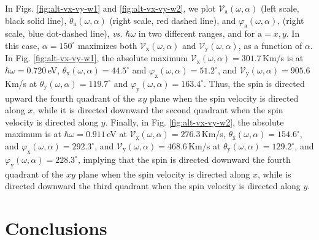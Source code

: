\documentclass[floatfix,prb,aps,superscriptaddress,showpacs,11pt,preprint,letterpaper]{revtex4}
\begin{document}
In Figs. \ref{fig:alt-vx-vy-w1} and \ref{fig:alt-vx-vy-w2}, we plot
$\mathcal{V}_{\mathrm{a}} (\omega,\alpha)$ (left scale, black solid line),
$\theta_{\mathrm{a}} (\omega,\alpha)$ (right scale, red dashed line), and
$\varphi_{\mathrm{a}} (\omega,\alpha)$, (right scale, blue dot-dashed  line), {\it vs.}
$\hbar\omega$ in two different ranges, and  for $\mathrm{a}=x,y$. In this case,
$\alpha=150^\circ$  maximizes both $\mathcal{V}_{\mathrm{x}} (\omega,\alpha)$
and $\mathcal{V}_{\mathrm{y}} (\omega,\alpha)$, as a function of $\alpha$. In
Fig. \ref{fig:alt-vx-vy-w1}, the absolute maximum $\mathcal{V}_{\mathrm{x}}
(\omega,\alpha) = 301.7$\,Km/s is at $\hbar\omega=0.720$\,eV,
$\theta_{\mathrm{x}} (\omega,\alpha) = 44.5^{\circ}$ and
$\varphi_{\mathrm{x}}(\omega,\alpha) = 51.2^{\circ}$, and
$\mathcal{V}_{\mathrm{y}} (\omega,\alpha) = 905.6$\,Km/s at
$\theta_{\mathrm{y}} (\omega,\alpha) = 119.7^{\circ}$ and
$\varphi_{\mathrm{y}}(\omega,\alpha) = 163.4^{\circ}$. Thus, the spin is
directed upward the fourth quadrant of the $xy$ plane when the spin
velocity is directed along $x$, while it is directed downward the second
quadrant when the spin velocity is directed along $y$. 
Finally, in
Fig. \ref{fig:alt-vx-vy-w2}, the absolute maximum is at $\hbar\omega=0.911$\,eV
at $\mathcal{V}_{\mathrm{x}} (\omega,\alpha) = 276.3$\,Km/s,
$\theta_{\mathrm{x}} (\omega,\alpha) = 154.6^{\circ}$, and
$\varphi_{\mathrm{x}}(\omega,\alpha) = 292.3^{\circ}$, and
$\mathcal{V}_{\mathrm{y}} (\omega,\alpha) = 468.6$\,Km/s at
$\theta_{\mathrm{y}} (\omega,\alpha) = 129.2^{\circ}$, and
$\varphi_{\mathrm{y}}(\omega,\alpha) = 228.3^{\circ}$, implying that the spin
is directed downward the fourth quadrant of the $xy$ plane when the
spin velocity is directed along $x$, while is directed downward the third
quadrant when the spin velocity is directed along $y$.

\section{Conclusions}
\label{sec:conclusions}
\end{document}
